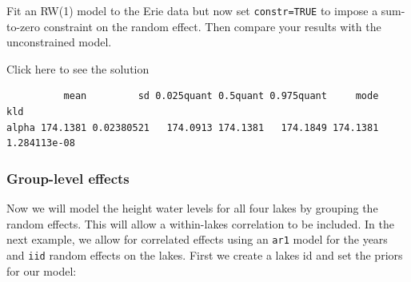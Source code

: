 \documentclass[
  letterpaper,
  DIV=11,
  numbers=noendperiod]{scrartcl}
\newenvironment{Shaded}{\begin{snugshade}}{\end{snugshade}}
\newcommand{\AttributeTok}[1]{\textcolor[rgb]{0.40,0.45,0.13}{#1}}
\newcommand{\CommentTok}[1]{\textcolor[rgb]{0.37,0.37,0.37}{#1}}
\newcommand{\ConstantTok}[1]{\textcolor[rgb]{0.56,0.35,0.01}{#1}}
\newcommand{\DecValTok}[1]{\textcolor[rgb]{0.68,0.00,0.00}{#1}}
\newcommand{\ErrorTok}[1]{\textcolor[rgb]{0.68,0.00,0.00}{#1}}
\newcommand{\FunctionTok}[1]{\textcolor[rgb]{0.28,0.35,0.67}{#1}}
\newcommand{\NormalTok}[1]{\textcolor[rgb]{0.00,0.23,0.31}{#1}}
\newcommand{\OtherTok}[1]{\textcolor[rgb]{0.00,0.23,0.31}{#1}}
\newcommand{\SpecialCharTok}[1]{\textcolor[rgb]{0.37,0.37,0.37}{#1}}
\newcommand{\StringTok}[1]{\textcolor[rgb]{0.13,0.47,0.30}{#1}}
\begin{document}
\begin{tcolorbox}[enhanced jigsaw, opacitybacktitle=0.6, toptitle=1mm, leftrule=.75mm, toprule=.15mm, breakable, bottomrule=.15mm, left=2mm, colframe=quarto-callout-warning-color-frame, colbacktitle=quarto-callout-warning-color!10!white, colback=white, bottomtitle=1mm, rightrule=.15mm, titlerule=0mm, coltitle=black, title={Task}, opacityback=0, arc=.35mm]

Fit an RW(1) model to the Erie data but now set \texttt{constr=TRUE} to
impose a sum-to-zero constraint on the random effect. Then compare your
results with the unconstrained model.

Click here to see the solution

\begin{Shaded}
\end{Shaded}

\begin{verbatim}
          mean         sd 0.025quant 0.5quant 0.975quant     mode          kld
alpha 174.1381 0.02380521   174.0913 174.1381   174.1849 174.1381 1.284113e-08
\end{verbatim}

\end{tcolorbox}

\subsubsection{Group-level effects}\label{group-level-effects}

Now we will model the height water levels for all four lakes by grouping
the random effects. This will allow a within-lakes correlation to be
included. In the next example, we allow for correlated effects using an
\texttt{ar1} model for the years and \texttt{iid} random effects on the
lakes. First we create a lakes id and set the priors for our model:
\end{document}
